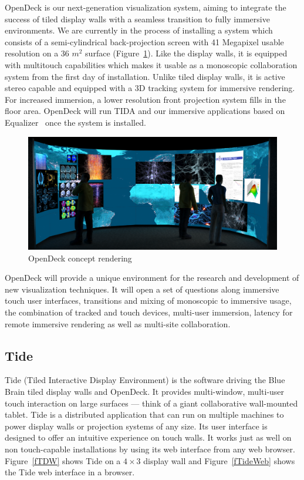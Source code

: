 \documentclass[10pt]{llncs}
\newcommand{\fig}[1]{Figure~\ref{#1}}
\begin{document}
OpenDeck is our next-generation visualization system, aiming to integrate the
success of tiled display walls with a seamless transition to fully immersive
environments. We are currently in the process of installing a system which
consists of a semi-cylindrical back-projection screen with 41 Megapixel usable
resolution on a 36 $m^2$ surface (\fig{fOpenDeck}). Like the display walls, it
is equipped with multitouch capabilities which makes it usable as a monoscopic
collaboration system from the first day of installation. Unlike tiled display
walls, it is active stereo capable and equipped with a 3D tracking system for
immersive rendering. For increased immersion, a lower resolution front
projection system fills in the floor area. OpenDeck will run TIDA and our
immersive applications based on Equalizer~\cite{EMP:09} once the system is
installed.

\begin{figure}[h!t]
  \includegraphics[width=\columnwidth]{images/opendeck}
  \caption{\label{fOpenDeck}OpenDeck concept rendering}
\end{figure}

OpenDeck will provide a unique environment for the research and development of
new visualization techniques. It will open a set of questions along immersive
touch user interfaces, transitions and mixing of monoscopic to immersive usage,
the combination of tracked and touch devices, multi-user immersion, latency for
remote immersive rendering as well as multi-site collaboration.

\subsection{Tide}

Tide (Tiled Interactive Display Environment) is the software driving the Blue
Brain tiled display walls and OpenDeck. It provides multi-window, multi-user
touch interaction on large surfaces --- think of a giant collaborative
wall-mounted tablet. Tide is a distributed application that can run on multiple
machines to power display walls or projection systems of any size. Its user
interface is designed to offer an intuitive experience on touch walls. It works
just as well on non touch-capable installations by using its web interface from
any web browser. \fig{fTDW} shows Tide on a $4\times 3$ display wall and
\fig{fTideWeb} shows the Tide web interface in a browser.
\end{document}
